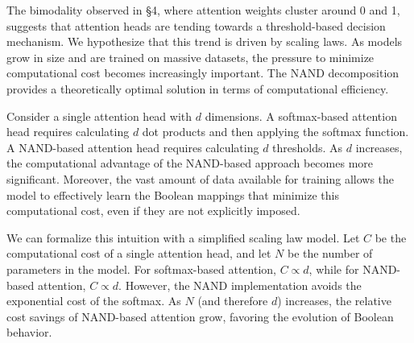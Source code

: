 The bimodality observed in §4, where attention weights cluster around 0 and 1, suggests that attention heads are tending towards a threshold-based decision mechanism.  We hypothesize that this trend is driven by scaling laws. As models grow in size and are trained on massive datasets, the pressure to minimize computational cost becomes increasingly important. The NAND decomposition provides a theoretically optimal solution in terms of computational efficiency.













Consider a single attention head with $d$ dimensions. A softmax-based attention head requires calculating $d$ dot products and then applying the softmax function. A NAND-based attention head requires calculating $d$ thresholds. As $d$ increases, the computational advantage of the NAND-based approach becomes more significant. Moreover, the vast amount of data available for training allows the model to effectively learn the Boolean mappings that minimize this computational cost, even if they are not explicitly imposed.













We can formalize this intuition with a simplified scaling law model. Let $C$ be the computational cost of a single attention head, and let $N$ be the number of parameters in the model.  For softmax-based attention, $C \propto d$, while for NAND-based attention, $C \propto d$. However, the NAND implementation avoids the exponential cost of the softmax. As $N$ (and therefore $d$) increases, the relative cost savings of NAND-based attention grow, favoring the evolution of Boolean behavior.













